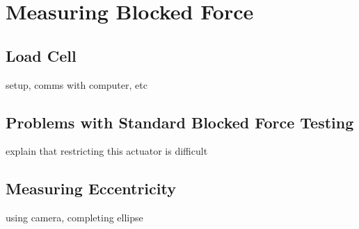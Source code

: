 \chapter{Measuring Blocked Force}
\section{Load Cell}
setup, comms with computer, etc
\section{Problems with Standard Blocked Force Testing}
explain that restricting this actuator is difficult
\section{Measuring Eccentricity}
using camera, completing ellipse